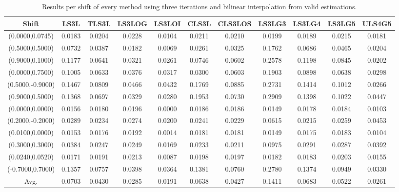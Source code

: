 \begin{table}[ht!]
\centering
\begin{tabular}{c|c|c|c|c|c|c|c|c|c|c}
Shift & \scriptsize{LS3L} & \scriptsize{TLS3L} & \scriptsize{LS3LOG} & \scriptsize{LS3LOI} & \scriptsize{CLS3L} & \scriptsize{CLS3LOS} & \scriptsize{LS3LG3} & \scriptsize{LS3LG4} & \scriptsize{LS3LG5} & \scriptsize{ULS4G5}\\ \hline 
(0.0000,0.0745) & 0.0183 & 0.0204 & 0.0228 & 0.0104 & 0.0211 & 0.0210 & 0.0199 & 0.0189 & 0.0215 & 0.0181 \\ \hline
(0.5000,0.5000) & 0.0732 & 0.0387 & 0.0182 & 0.0069 & 0.0261 & 0.0325 & 0.1762 & 0.0686 & 0.0465 & 0.0204 \\ \hline
(0.9000,0.1000) & 0.1177 & 0.0641 & 0.0321 & 0.0261 & 0.0746 & 0.0602 & 0.2578 & 0.1198 & 0.0845 & 0.0202 \\ \hline
(0.0000,0.7500) & 0.1005 & 0.0633 & 0.0376 & 0.0317 & 0.0300 & 0.0603 & 0.1903 & 0.0898 & 0.0638 & 0.0298 \\ \hline
(0.5000,-0.9000) & 0.1467 & 0.0809 & 0.0466 & 0.0432 & 0.1769 & 0.0885 & 0.2731 & 0.1414 & 0.1012 & 0.0266 \\ \hline
(0.9000,0.5000) & 0.1368 & 0.0697 & 0.0329 & 0.0280 & 0.1953 & 0.0730 & 0.2909 & 0.1398 & 0.1022 & 0.0447 \\ \hline
(0.0000,0.0000) & 0.0156 & 0.0180 & 0.0196 & 0.0000 & 0.0186 & 0.0186 & 0.0149 & 0.0178 & 0.0184 & 0.0103 \\ \hline
(0.2000,-0.2000) & 0.0289 & 0.0234 & 0.0274 & 0.0200 & 0.0241 & 0.0229 & 0.0615 & 0.0215 & 0.0259 & 0.0453 \\ \hline
(0.0100,0.0000) & 0.0153 & 0.0176 & 0.0192 & 0.0014 & 0.0181 & 0.0181 & 0.0149 & 0.0175 & 0.0183 & 0.0104 \\ \hline
(0.3000,0.3000) & 0.0384 & 0.0247 & 0.0249 & 0.0169 & 0.0233 & 0.0211 & 0.0975 & 0.0291 & 0.0287 & 0.0392 \\ \hline
(0.0240,0.0520) & 0.0171 & 0.0191 & 0.0213 & 0.0087 & 0.0198 & 0.0197 & 0.0182 & 0.0183 & 0.0203 & 0.0155 \\ \hline
(-0.7000,0.7000) & 0.1357 & 0.0757 & 0.0398 & 0.0364 & 0.1381 & 0.0760 & 0.2780 & 0.1374 & 0.0949 & 0.0330 \\ \hline
Avg.  & 0.0703 & 0.0430 & 0.0285 & 0.0191 & 0.0638 & 0.0427 & 0.1411 & 0.0683 & 0.0522 & 0.0261 \\ \hline
\end{tabular}
\caption{Results per shift of every method using three iterations and bilinear interpolation from valid estimations.}
\label{tab:3itLperShiftValid}
\end{table}


